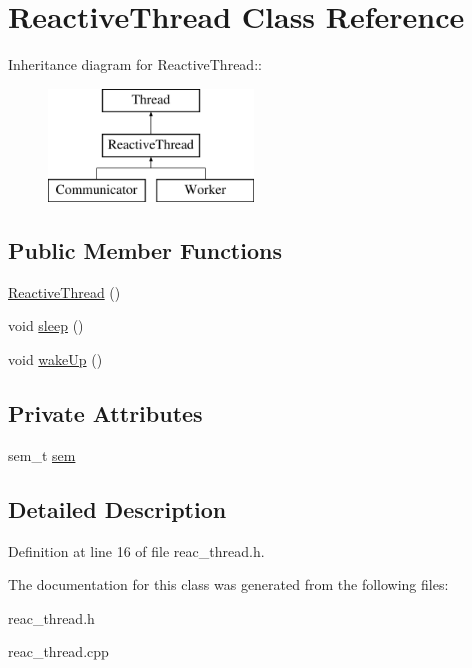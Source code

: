 \hypertarget{classReactiveThread}{
\section{Reactive\-Thread Class Reference}
\label{classReactiveThread}
}
Inheritance diagram for Reactive\-Thread::\begin{figure}[H]
\begin{center}
\leavevmode
\includegraphics[height=3cm]{classReactiveThread}
\end{center}
\end{figure}
\subsection*{Public Member Functions}
\begin{CompactItemize}
\item 
\hypertarget{classReactiveThread_77381649429941c99a3e3d568113d6cf}{
\hyperlink{classReactiveThread_77381649429941c99a3e3d568113d6cf}{Reactive\-Thread} ()}
\label{classReactiveThread_77381649429941c99a3e3d568113d6cf}

\item 
\hypertarget{classReactiveThread_8263c2a32d8c99a49a05f1a7717d4262}{
void \hyperlink{classReactiveThread_8263c2a32d8c99a49a05f1a7717d4262}{sleep} ()}
\label{classReactiveThread_8263c2a32d8c99a49a05f1a7717d4262}

\item 
\hypertarget{classReactiveThread_a724a54575de10f09cc03ab7aa4e59ce}{
void \hyperlink{classReactiveThread_a724a54575de10f09cc03ab7aa4e59ce}{wake\-Up} ()}
\label{classReactiveThread_a724a54575de10f09cc03ab7aa4e59ce}

\end{CompactItemize}
\subsection*{Private Attributes}
\begin{CompactItemize}
\item 
\hypertarget{classReactiveThread_915e5a42dc8cb1bcf6738d5fe883a4e7}{
sem\_\-t \hyperlink{classReactiveThread_915e5a42dc8cb1bcf6738d5fe883a4e7}{sem}}
\label{classReactiveThread_915e5a42dc8cb1bcf6738d5fe883a4e7}

\end{CompactItemize}


\subsection{Detailed Description}




Definition at line 16 of file reac\_\-thread.h.

The documentation for this class was generated from the following files:\begin{CompactItemize}
\item 
reac\_\-thread.h\item 
reac\_\-thread.cpp\end{CompactItemize}
